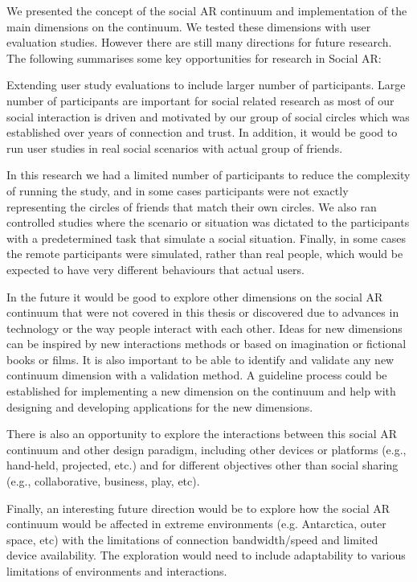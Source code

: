 We presented the concept of the social AR continuum and implementation of the main dimensions on the continuum. We tested these dimensions with user evaluation studies. However there are still many directions for future research. The following summarises some key opportunities for research in Social AR:  

Extending user study evaluations to include larger number of participants. Large number of participants are important for social related research as most of our social interaction is driven and motivated by our group of social circles which was established over years of connection and trust.  In addition, it would be good to run user studies in real social scenarios with actual group of friends.

In this research we had a limited number of participants to reduce the complexity of running the study, and in some cases participants were not exactly representing the circles of friends that match their own circles. We also ran controlled studies where the scenario or situation was dictated to the participants with a predetermined task that simulate a social situation. Finally, in some cases the remote participants were simulated, rather than real people, which would be expected to have very different behaviours that actual users.

In the future it would be good to explore other dimensions on the social AR continuum that were not covered in this thesis or discovered due to advances in technology or the way people interact with each other. 
Ideas for new dimensions can be inspired by new interactions methods or based on imagination or fictional books or films. 
It is also important to be able to identify and validate any new continuum dimension with a validation method. A guideline process could be established for implementing a new dimension on the continuum and help with designing and developing applications for the new dimensions. 

There is also an opportunity to explore the interactions between this social AR continuum and other design paradigm, including other devices or platforms (e.g., hand-held, projected, etc.) and for different objectives other than social sharing (e.g., collaborative, business, play, etc).

Finally, an interesting future direction would be to explore how the social AR continuum would be affected in extreme environments (e.g. Antarctica, outer space, etc) with the limitations of connection bandwidth/speed and limited device availability. The exploration would need to include adaptability to various limitations of environments and interactions. 

